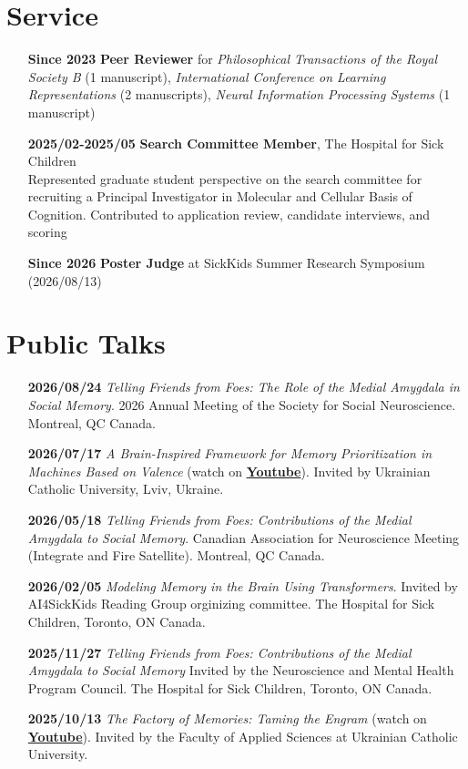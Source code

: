 \documentclass[12pt]{article}
\begin{document}
\section*{Service}
\begin{itemize}
    \item[\textbf{Since 2023}] \textbf{Peer Reviewer} for \textit{Philosophical Transactions of the Royal Society B} (1 manuscript), \textit{International Conference on Learning Representations} (2 manuscripts), \textit{Neural Information Processing Systems} (1 manuscript)
    \item[\textbf{2025/02-2025/05}] \textbf{Search Committee Member}, The Hospital for Sick Children \\ 
    Represented graduate student perspective on the search committee for recruiting a Principal Investigator in Molecular and Cellular Basis of Cognition. Contributed to application review, candidate interviews, and scoring
    \item[\textbf{Since 2026}] \textbf{Poster Judge} at SickKids Summer Research Symposium (2026/08/13)
\end{itemize}

\section*{Public Talks}
\begin{itemize}
    \item[\textbf{2026/08/24}] \textit{Telling Friends from Foes: The Role of the Medial Amygdala in Social Memory}. 2026 Annual Meeting of the Society for Social Neuroscience. Montreal, QC Canada.
    \item[\textbf{2026/07/17}] \textit{A Brain-Inspired Framework for Memory Prioritization in Machines Based on Valence} (watch on \href{https://www.youtube.com/watch?v=xtZlDW3E3bw}{\textbf{Youtube}}). Invited by Ukrainian Catholic University, Lviv, Ukraine.
    \item[\textbf{2026/05/18}] \textit{Telling Friends from Foes: Contributions of the Medial Amygdala to Social Memory}. Canadian Association for Neuroscience Meeting (Integrate and Fire Satellite). Montreal, QC Canada.
    \item[\textbf{2026/02/05}] \textit{Modeling Memory in the Brain Using Transformers}. Invited by AI4SickKids Reading Group orginizing committee. The Hospital for Sick Children, Toronto, ON Canada. 
    \item[\textbf{2025/11/27}] \textit{Telling Friends from Foes: Contributions of the Medial Amygdala to Social Memory} Invited by the Neuroscience and Mental Health Program Council. The Hospital for Sick Children, Toronto, ON Canada.
    \item[\textbf{2025/10/13}] \textit{The Factory of Memories: Taming the Engram} (watch on \href{https://www.youtube.com/watch?v=ETVgqyQwZVM}{\textbf{Youtube}}). Invited by the Faculty of Applied Sciences at Ukrainian Catholic University.
\end{itemize}
\end{document}
